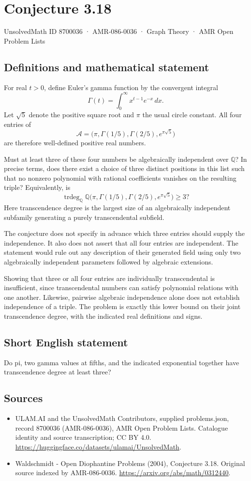 \documentclass[11pt,a4paper]{article}
\begin{document}
\section*{Conjecture 3.18}\label{8700036}
{\small UnsolvedMath ID 8700036 · AMR-086-0036 · Graph Theory · AMR Open Problem Lists}
\subsection{Definitions and mathematical statement}
For real $t>0$, define Euler's gamma function by the convergent integral
\[
\Gamma(t)=\int_0^\infty x^{t-1}e^{-x}\,dx.
\]
Let $\sqrt5$ denote the positive square root and $\pi$ the usual circle constant. All four entries of
\[
\mathcal A=\bigl(\pi,\Gamma(1/5),\Gamma(2/5),e^{\pi\sqrt5}\bigr)
\]
are therefore well-defined positive real numbers.

Must at least three of these four numbers be algebraically independent over $\mathbb Q$? In precise terms, does there exist a choice of three distinct positions in this list such that no nonzero polynomial with rational coefficients vanishes on the resulting triple? Equivalently, is
\[
\operatorname{trdeg}_{\mathbb Q}
\mathbb Q\bigl(\pi,\Gamma(1/5),\Gamma(2/5),e^{\pi\sqrt5}\bigr)\ge3?
\]
Here transcendence degree is the largest size of an algebraically independent subfamily generating a purely transcendental subfield.

The conjecture does not specify in advance which three entries should supply the independence. It also does not assert that all four entries are independent. The statement would rule out any description of their generated field using only two algebraically independent parameters followed by algebraic extensions.

Showing that three or all four entries are individually transcendental is insufficient, since transcendental numbers can satisfy polynomial relations with one another. Likewise, pairwise algebraic independence alone does not establish independence of a triple. The problem is exactly this lower bound on their joint transcendence degree, with the indicated real definitions and signs.
\subsection{Short English statement}
Do pi, two gamma values at fifths, and the indicated exponential together have transcendence degree at least three?
\subsection{Sources}
\begin{itemize}
\item[S1] ULAM.AI and the UnsolvedMath Contributors, supplied problems.json, record 8700036 (AMR-086-0036), AMR Open Problem Lists. Catalogue identity and source transcription; CC BY 4.0.
\url{https://huggingface.co/datasets/ulamai/UnsolvedMath}.
\item[S2] Waldschmidt - Open Diophantine Problems (2004), Conjecture 3.18. Original source indexed by AMR-086-0036.
\url{https://arxiv.org/abs/math/0312440}.
\end{itemize}
\end{document}
